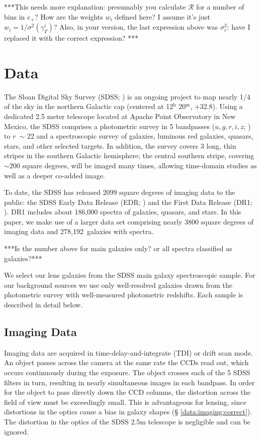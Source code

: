 \documentclass{emulateapj}
\newcommand{\rmag}{$r$}
\newcommand{\hrs}{$^{\mathrm h}$}
\newcommand{\minutes}{$^{\mathrm m}$}
\newcommand{\ugriz}{$u, g, r, i, z$}
\newcommand{\numspectot}{278,192}
\begin{document}
***This needs more explanation: presumably you calculate $\mathcal{R}$ for 
a number of bins in $e_+$? How are the weights $w_i$ defined here? I assume 
it's just $w_i = 1/\sigma^2(\gamma_T^i)$? 
Also, in your version, the last expression above was $\sigma^2_e$: have 
I replaced it with the correct expression? ***

\section{Data} \label{data}

The Sloan Digital Sky Survey (SDSS; \cite{York00}) is an ongoing project to map
nearly 1/4 of the sky in the northern Galactic cap (centered at 12\hrs
20\minutes, +32.8\degr).  Using a dedicated 2.5 meter telescope
located at Apache Point Observatory in New Mexico, the SDSS comprises a photometric
survey in 5 bandpasses (\ugriz; \citet{Fukugita96}) to \rmag\ $\sim$ 22 
and a spectroscopic survey of galaxies, luminous red galaxies, quasars, 
stars, and other selected targets. In
addition, the survey covers 3 long, thin stripes in the southern Galactic 
hemisphere; the central southern stripe, covering 
$\sim 200$ square degrees, will be imaged many times, 
allowing time-domain studies as well as a deeper co-added image.

To date, the SDSS has released 2099 square degrees of imaging data to the
public: the SDSS Early Data Release (EDR; \citet{Stough02}) and the First Data
Release (DR1; \citet{Abaz03}).  DR1 includes about 186,000 spectra of
galaxies, quasars, and stars.  In this paper, we make use of a larger data set 
comprising nearly 3800 square degrees of imaging data and \numspectot\ galaxies with
spectra. 

***Is the number above for main galaxies only? or all spectra classified as 
galaxies?***

We select our lens galaxies from the SDSS main galaxy spectroscopic sample.  
For our background 
sources we use only well-resolved galaxies drawn from the photometric survey 
with well-measured photometric redshifts. Each sample is described in detail below.

\subsection{Imaging Data} \label{data:imaging}

Imaging data are acquired in time-delay-and-integrate (TDI) or drift scan mode.
An object passes across the camera at the same rate the CCDs read out, which
occurs continuously during the exposure.  The object crosses each of the 5
SDSS filters in turn, resulting in nearly simultaneous images in each bandpass.
In order for the object to pass directly down the CCD columns, the distortion
across the field of view must be exceedingly small.  This is advantageous for
lensing, since distortions in the optics cause a bias in galaxy shapes (\S
\ref{data:imaging:correct}).
The distortion in the optics of the SDSS 2.5m telescope is negligible 
\citep{Stough02} and can be ignored. 
\end{document}

